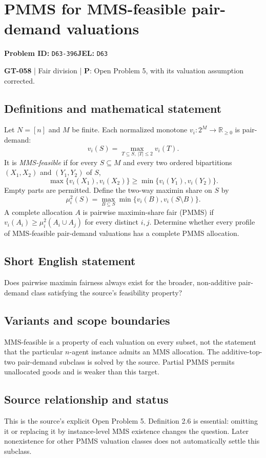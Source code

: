\documentclass[11pt,a4paper]{article}
\begin{document}
\section*{PMMS for MMS-feasible pair-demand valuations}
\textbf{Problem ID:} \texttt{D63-396}\quad \textbf{JEL:} \texttt{D63}\par
\label{problem:OP-0188}
\label{game:GT-058}
{\sffamily\small\color{muted}
\textbf{GT-058} | Fair division | \textbf{P}: Open Problem 5, with its valuation assumption corrected.
\par}
\subsection*{Definitions and mathematical statement}
Let $N=[n]$ and $M$ be finite. Each normalized monotone $v_i:2^M\to\mathbb R_{\geq0}$ is pair-demand:
\[
 v_i(S)=\max_{T\subseteq S,\ |T|\leq2}v_i(T).
\]
It is \emph{MMS-feasible} if for every $S\subseteq M$ and every two ordered bipartitions $(X_1,X_2)$ and $(Y_1,Y_2)$ of $S$,
\[
 \max\{v_i(X_1),v_i(X_2)\}\geq
 \min\{v_i(Y_1),v_i(Y_2)\}.
\]
Empty parts are permitted. Define the two-way maximin share on $S$ by
\[
 \mu_i^2(S)=\max_{B\subseteq S}\min\{v_i(B),v_i(S\setminus B)\}.
\]
A complete allocation $A$ is pairwise maximin-share fair (PMMS) if $v_i(A_i)\geq\mu_i^2(A_i\cup A_j)$ for every distinct $i,j$. Determine whether every profile of MMS-feasible pair-demand valuations has a complete PMMS allocation.
\subsection*{Short English statement}
Does pairwise maximin fairness always exist for the broader, non-additive pair-demand class satisfying the source's feasibility property?
\subsection*{Variants and scope boundaries}
MMS-feasible is a property of each valuation on every subset, not the statement that the particular $n$-agent instance admits an MMS allocation. The additive-top-two pair-demand subclass is solved by the source. Partial PMMS permits unallocated goods and is weaker than this target.
\subsection*{Source relationship and status}
This is the source's explicit Open Problem 5. Definition 2.6 is essential: omitting it or replacing it by instance-level MMS existence changes the question. Later nonexistence for other PMMS valuation classes does not automatically settle this subclass.
\end{document}
